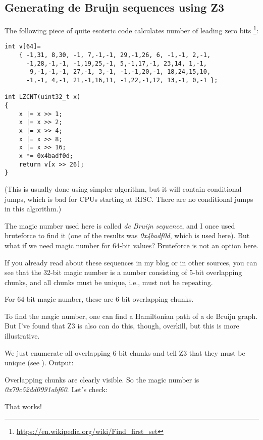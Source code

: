 \subsection{Generating de Bruijn sequences using Z3}
\label{DeBruijnZ3}

\renewcommand{\CURPATH}{equations/de_bruijn_SMT}

The following piece of quite esoteric code calculates number of leading zero bits
\footnote{\url{https://en.wikipedia.org/wiki/Find_first_set}}:

\begin{lstlisting}
int v[64]=
	{ -1,31, 8,30, -1, 7,-1,-1, 29,-1,26, 6, -1,-1, 2,-1,
	  -1,28,-1,-1, -1,19,25,-1, 5,-1,17,-1, 23,14, 1,-1,
	   9,-1,-1,-1, 27,-1, 3,-1, -1,-1,20,-1, 18,24,15,10,
	  -1,-1, 4,-1, 21,-1,16,11, -1,22,-1,12, 13,-1, 0,-1 };

int LZCNT(uint32_t x)
{
    x |= x >> 1;
    x |= x >> 2;
    x |= x >> 4;
    x |= x >> 8;
    x |= x >> 16;
    x *= 0x4badf0d;
    return v[x >> 26];
}
\end{lstlisting}

(This is usually done using simpler algorithm, but it will contain conditional jumps, which is bad for
CPUs starting at RISC. There are no conditional jumps in this algorithm.)

The magic number used here is called \textit{de Bruijn sequence},
and I once used bruteforce to find it (one of the results was \textit{0x4badf0d}, which is used here).
But what if we need magic number for 64-bit values?
Bruteforce is not an option here.

If you already read about these sequences in my blog or in other sources,
you can see that the 32-bit magic number is a number consisting
of 5-bit overlapping chunks, and all chunks must be unique, i.e., must not be repeating.

For 64-bit magic number, these are 6-bit overlapping chunks.

To find the magic number, one can find a Hamiltonian path of a de Bruijn graph.
But I've found that Z3 is also can do this, though, overkill, but this is more illustrative.



We just enumerate all overlapping 6-bit chunks and tell Z3 that they must be unique (see ).
Output:



Overlapping chunks are clearly visible.
So the magic number is \textit{0x79c52dd0991abf60}.
Let's check:



That works!


